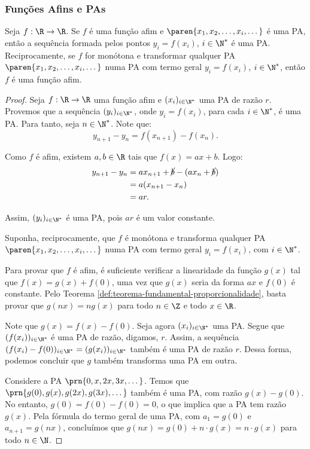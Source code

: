 \subsubsection{Funções Afins e PAs}

\begin{proposition}
Seja  $f: \R \to \R$. Se $f$ é uma função afim e $\paren{x_1, x_2,
\dots , x_i, \dots}$ é uma PA, então a sequência formada pelos
pontos $y_i = f(x_i)$, $i \in \N^*$ é uma PA. Reciprocamente,
se $f$ for monótona e transformar qualquer PA $\paren{x_1, x_2,
\dots , x_i, \dots}$ numa PA com termo geral $y_i = f(x_i)$, $i \in
\N^*$, então $f$ é uma função afim.    
\end{proposition}

\begin{proof}
	Seja $f: \R \to \R$ uma função afim e $(x_i)_{i\in\N^*}$ uma PA de razão $r$. 
	Provemos que a sequência $(y_i)_{i\in\N^*}$, onde $y_i = f(x_i)$, para cada $i \in \N^*$, 
	é uma PA.
	Para tanto, seja $n \in \N^*$. 
	Note que:
	\[
		y_{n+1}-y_n = f(x_{n+1})-f(x_n).
	\]

	Como $f$ é afim, existem $a,b\in\R$ tais que $f(x)=ax+b$.
	Logo:
	\begin{align*}
		y_{n+1}-y_n &= ax_{n+1}+\cancel b - (ax_n+\cancel b) \\ &= a(x_{n+1}-x_n) \\ &= ar.
	\end{align*}
	
	Assim, $(y_i)_{i\in\N^*}$ é uma PA, pois $ar$ é um valor constante.

	Suponha, reciprocamente, que $f$ é monótona e transforma qualquer
	PA $\paren{x_1, x_2, \dots , x_i, \dots}$ numa PA com termo geral $y_i = f(x_i)$, com $i \in
	\N^*$. 

	Para provar que $f$ é afim, é suficiente verificar a linearidade da função $g(x)$ tal que
	$f(x) = g(x) + f(0)$, uma vez que $g(x)$ seria da forma $ax$ e $f(0)$ é constante. 
	Pelo Teorema \ref{def:teorema-fundamental-proporcionalidade}, basta provar que 
	$g(nx) = ng(x)$ para todo $n \in \Z$ e todo $x \in \R$.

	Note que $g(x) = f(x) - f(0)$. Seja agora $(x_i)_{i\in\N^*}$ uma PA. Segue que $(f(x_i))_{i\in\N^*}$ é uma PA de razão, digamos,  $r$. Assim, a sequência $(f(x_i)-f(0))_{i\in\N^*} = (g(x_i))_{i\in\N^*}$ também é uma PA de razão $r$. Dessa forma, podemos concluir que $g$ também transforma uma PA em outra.

	Considere a PA $\prn{0, x, 2x, 3x, \dots}$. Temos que $\prn{g(0), g(x), g(2x), g(3x), \dots}$
	também é uma PA, com razão $g(x)-g(0)$. No entanto, $g(0) = f(0)-f(0) = 0$, o que implica que a PA tem
	razão $g(x)$. Pela fórmula do termo geral de uma PA, com $a_1 = g(0)$ e $a_{n+1} = g(nx)$,
	concluímos que $g(nx) = g(0) + n\cdot g(x) = n\cdot g(x)$
	para todo $n \in \N$.


\end{proof}
